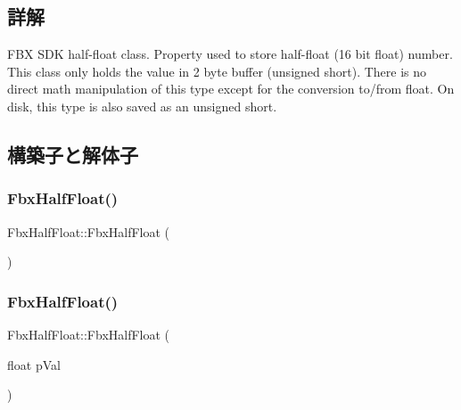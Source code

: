 \subsection{詳解}
F\+BX S\+DK half-\/float class. Property used to store half-\/float (16 bit float) number. This class only holds the value in 2 byte buffer (unsigned short). There is no direct math manipulation of this type except for the conversion to/from float. On disk, this type is also saved as an unsigned short. 

\subsection{構築子と解体子}
\mbox{\label{class_fbx_half_float_adcba4ec850646381daa19115b9e40879}} 
\subsubsection{\texorpdfstring{Fbx\+Half\+Float()}{FbxHalfFloat()}\hspace{0.1cm}{\footnotesize\ttfamily [1/3]}}
{\footnotesize\ttfamily Fbx\+Half\+Float\+::\+Fbx\+Half\+Float (\begin{DoxyParamCaption}{ }\end{DoxyParamCaption})}

\mbox{\label{class_fbx_half_float_acd47a47c67b0d9c57bfbb7055615c303}} 
\subsubsection{\texorpdfstring{Fbx\+Half\+Float()}{FbxHalfFloat()}\hspace{0.1cm}{\footnotesize\ttfamily [2/3]}}
{\footnotesize\ttfamily Fbx\+Half\+Float\+::\+Fbx\+Half\+Float (\begin{DoxyParamCaption}\item[{float}]{p\+Val }\end{DoxyParamCaption})}

\mbox{\label{class_fbx_half_float_ae8971c684f7e3c98be4906947dc5e01f}} 
